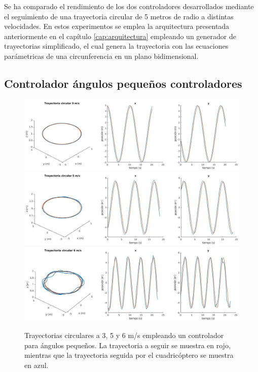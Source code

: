 Se ha comparado el rendimiento de los dos controladores desarrollados mediante el seguimiento de una trayectoria circular de 5 metros de radio a distintas velocidades. En estos experimentos se emplea la arquitectura presentada anteriormente en el capítulo \ref{cap:arquitectura} empleando un generador de trayectorias simplificado, el cual genera la trayectoria con las ecuaciones parámetricas de una circunferencia en un plano bidimensional.

\subsection{Controlador ángulos pequeños controladores}


\begin{figure}[htb!]
	\centering
	\includegraphics[width=\textwidth]{imagenes/circle3ms}
	\includegraphics[width=\textwidth]{imagenes/circle5ms}
	\includegraphics[width=\textwidth]{imagenes/circle6ms}
	\caption{Trayectorias circulares a 3, 5 y 6 m/s empleando un controlador para ángulos pequeños. La trayectoria a seguir se muestra en rojo, mientras que la trayectoria seguida por el cuadricóptero se muestra en azul.}	\label{circle:slow}
\end{figure}
\newpage
